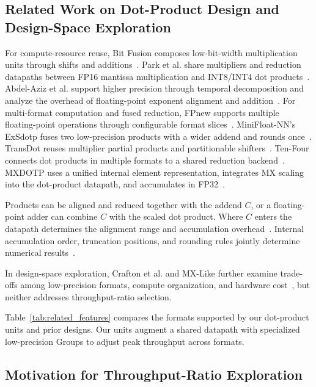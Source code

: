 \documentclass[conference,10pt,letterpaper]{IEEEtran}
\begin{document}


\subsection{Related Work on Dot-Product Design and Design-Space Exploration}
\label{sec:datapath_sharing}

For compute-resource reuse, Bit Fusion composes low-bit-width multiplication units through shifts and additions~\cite{bitfusion2018}. Park et al. share multipliers and reduction datapaths between FP16 mantissa multiplication and INT8/INT4 dot products~\cite{parkMultimode8KMACHWutilizationaware2022}. Abdel-Aziz et al. support higher precision through temporal decomposition and analyze the overhead of floating-point exponent alignment and addition~\cite{abdelaziz2021overheads}. For multi-format computation and fused reduction, FPnew supports multiple floating-point operations through configurable format slices~\cite{mach2021fpnew}. MiniFloat-NN's ExSdotp fuses two low-precision products with a wider addend and rounds once~\cite{bertaccini2022minifloat}. TransDot reuses multiplier partial products and partitionable shifters~\cite{transdot2026}. Ten-Four connects dot products in multiple formats to a shared reduction backend~\cite{rout2026tenfourv3}. MXDOTP uses a unified internal element representation, integrates MX scaling into the dot-product datapath, and accumulates in FP32~\cite{islamoglu2025mxdotp}.

Products can be aligned and reduced together with the addend $C$, or a floating-point adder can combine $C$ with the scaled dot product. Where $C$ enters the datapath determines the alignment range and accumulation overhead~\cite{lutzFusedFP84Way2024}. Internal accumulation order, truncation positions, and rounding rules jointly determine numerical results~\cite{sun2023tensorcores,xie2025mmasim}.

In design-space exploration, Crafton et al. and MX-Like further examine trade-offs among low-precision formats, compute organization, and hardware cost~\cite{paretomac2025,zhao2026mxlike}, but neither addresses throughput-ratio selection.

Table~\ref{tab:related_features} compares the formats supported by our dot-product units and prior designs. Our units augment a shared datapath with specialized low-precision Groups to adjust peak throughput across formats.

\subsection{Motivation for Throughput-Ratio Exploration}
\label{sec:commercial_ratios}
\label{sec:ratio_motivation}
\end{document}
